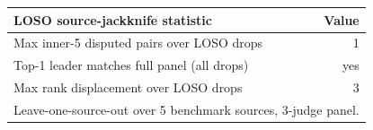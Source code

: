 \begin{tabular}{lr}
\toprule
LOSO source-jackknife statistic & Value\\
\midrule
Max inner-5 disputed pairs over LOSO drops & 1 \\
Top-1 leader matches full panel (all drops) & yes \\
Max rank displacement over LOSO drops & 3 \\
\midrule
\multicolumn{2}{l}{\footnotesize Leave-one-source-out over 5 benchmark sources, 3-judge panel.} \\
\bottomrule
\end{tabular}